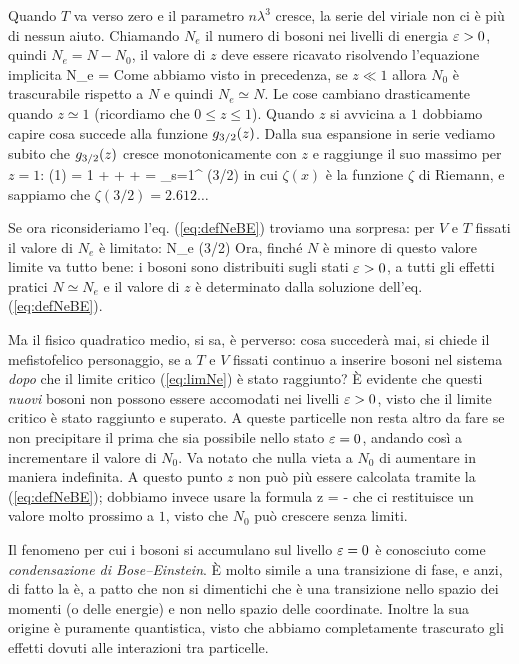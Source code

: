 Quando $T$ va verso zero e il parametro $n\lambda^3$ cresce, la serie del viriale non ci è più di nessun aiuto. Chiamando $N_e$ il numero di bosoni nei livelli di energia $\varepsilon > 0$, quindi $N_e = N - N_0$, il valore di $z$ deve essere ricavato risolvendo l'equazione implicita
\be
\label{eq:defNeBE}
N_e = 
\ee
Come abbiamo visto in precedenza, se $z \ll 1$ allora $N_0$ è trascurabile rispetto a $N$ e quindi $N_e \simeq N$. Le cose cambiano drasticamente quando $z\simeq 1$ (ricordiamo che $0 \le z \le 1$). Quando $z$ si avvicina a $1$ dobbiamo capire cosa succede alla funzione $g_{3/2}(z)$. Dalla sua espansione in serie vediamo subito che $g_{3/2}(z)$ cresce monotonicamente con $z$ e raggiunge il suo massimo per $z=1$:
\be
{}(1) = 1 +  +  + \cdots
= \sum_{s=1}^\infty {} \equiv \zeta(3/2)
\ee
in cui $\zeta(x)$ è la funzione $\zeta$ di Riemann, e sappiamo che $\zeta(3/2) = 2.612\dots$

Se ora riconsideriamo l'eq. (\ref{eq:defNeBE}) troviamo una sorpresa: per $V$ e $T$ fissati il valore di $N_e$ è limitato:
\be
\label{eq:limNe}
N_e \le {}\zeta(3/2)
\ee
Ora, finché $N$ è minore di questo valore limite va tutto bene: i bosoni sono distribuiti sugli stati $\varepsilon > 0$, a tutti gli effetti pratici $N \simeq N_e$ e il valore di $z$ è determinato dalla soluzione dell'eq. (\ref{eq:defNeBE}).

Ma il fisico quadratico medio, si sa, è perverso: cosa succederà mai, si chiede il mefistofelico personaggio, se a $T$ e $V$ fissati continuo a inserire bosoni nel sistema {\em dopo} che il limite critico (\ref{eq:limNe}) è stato raggiunto? È evidente che questi {\em nuovi} bosoni non possono essere accomodati nei livelli $\varepsilon>0$, visto che il limite critico è stato raggiunto e superato. A queste particelle non resta altro da fare se non precipitare il prima che sia possibile nello stato $\varepsilon=0$, andando così a incrementare il valore di $N_0$. Va notato che nulla vieta a $N_0$ di aumentare in maniera indefinita. A questo punto $z$ non può più essere calcolata tramite la (\ref{eq:defNeBE}); dobbiamo invece usare la formula
\be
z =  - 
\ee
che ci restituisce un valore molto prossimo a $1$, visto che $N_0$ può crescere senza limiti.

Il fenomeno per cui i bosoni si accumulano sul livello $\varepsilon=0$ è conosciuto come {\em condensazione di Bose--Einstein}. È molto simile a una transizione di fase, e anzi, di fatto la è, a patto che non si dimentichi che è una transizione nello spazio dei momenti (o delle energie) e non nello spazio delle coordinate. Inoltre la sua origine è puramente quantistica, visto che abbiamo completamente trascurato gli effetti dovuti alle interazioni tra particelle.

